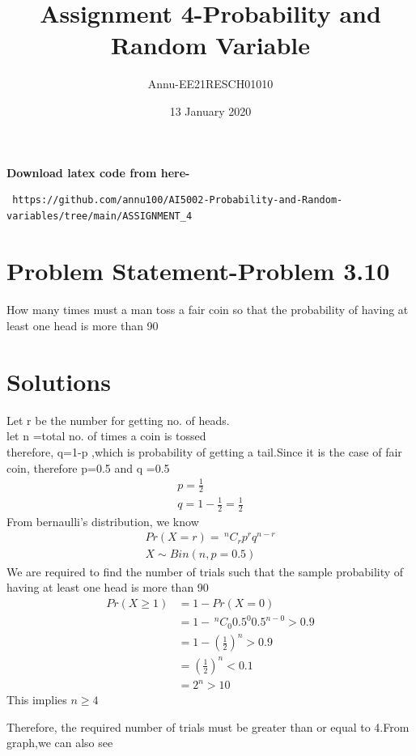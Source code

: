 \documentclass[journel,12pt,twocoloums]{IEEEtran}
\title{Assignment 4-Probability and Random Variable}
\author{Annu-EE21RESCH01010}
\date{13 January 2020}
\providecommand{\nCr}[2]{\,^{#1}C_{#2}}
\begin{document}
 \maketitle
\textbf{Download latex code from here-}\\
\begin{lstlisting}
 https://github.com/annu100/AI5002-Probability-and-Random-variables/tree/main/ASSIGNMENT_4
 \end{lstlisting}
 \section{Problem Statement-Problem 3.10}
How many times must a man toss a fair coin
so that the probability of having at least one
head is more than 90%
\section{Solutions}

Let r be the number for getting no. of  heads. \\
let n =total no. of times a coin is tossed\\
therefore, q=1-p ,which is probability of getting a tail.Since it is the case of fair coin, therefore p=0.5 and q =0.5\\
\begin{align}
    p=\frac{1}{2} \\
    q=1-\frac{1}{2}=\frac{1}{2}
\end{align}
From bernaulli's distribution, we know\\
\begin{align}
    Pr(X=r)= \nCr{n}{r} p^r q^{n-r}  \\
    X \sim Bin(n,p=0.5)
\end{align}
We are required to find the number of trials such that the sample  probability of having at least one
head is more than 90%
\begin{align}
    Pr(X \ge 1) &=1-Pr(X=0)\\
                &=1-\nCr{n}{0} 0.5^0 0.5^{n-0} >0.9 \\
                &=1-(\frac{1}{2})^n >0.9\\
                &=(\frac{1}{2})^n < 0.1\\
                &= 2^{n} >10
\end{align}
This implies $n \ge 4$


Therefore, the required number of trials must be greater than or equal to 4.From graph,we can also see\\
\end{document}
